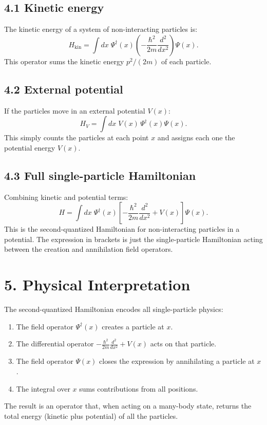 \documentclass[12pt,a4paper]{article}
\begin{document}
\subsection{4.1 Kinetic energy}

The kinetic energy of a system of non-interacting particles is:
\[
    H_{\text{kin}} = \int dx\;\Psi^\dagger(x)\left(-\frac{\hbar^2}{2m}\frac{d^2}{dx^2}\right)\Psi(x).
\]
This operator sums the kinetic energy $p^2/(2m)$ of each particle.

\subsection{4.2 External potential}

If the particles move in an external potential $V(x)$:
\[
    H_V = \int dx\;V(x)\,\Psi^\dagger(x)\Psi(x).
\]
This simply counts the particles at each point $x$ and assigns each one the potential energy $V(x)$.

\subsection{4.3 Full single-particle Hamiltonian}

Combining kinetic and potential terms:
\[
    \boxed{H = \int dx\;\Psi^\dagger(x)\left[-\frac{\hbar^2}{2m}\frac{d^2}{dx^2} + V(x)\right]\Psi(x).}
\]
This is the second-quantized Hamiltonian for non-interacting particles in a potential.  The expression in brackets is just the single-particle Hamiltonian acting between the creation and annihilation field operators.

\section{5. Physical Interpretation}

The second-quantized Hamiltonian encodes all single-particle physics:
\begin{enumerate}[nosep]
    \item The field operator $\Psi^\dagger(x)$ creates a particle at $x$.
    \item The differential operator $-\frac{\hbar^2}{2m}\frac{d^2}{dx^2} + V(x)$ acts on that particle.
    \item The field operator $\Psi(x)$ closes the expression by annihilating a particle at $x$.
    \item The integral over $x$ sums contributions from all positions.
\end{enumerate}
The result is an operator that, when acting on a many-body state, returns the total energy (kinetic plus potential) of all the particles.
\end{document}
